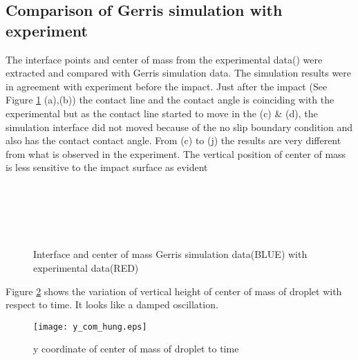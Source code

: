 \subsection{Comparison of Gerris simulation with experiment}
The interface points and center of mass from the experimental data(\cite{Hung2011}) were extracted and compared with Gerris simulation data. 
The simulation results were in agreement with experiment before the impact. Just after the impact (See Figure \ref{Fig:gs5} (a),(b)) the contact line and the contact angle is coinciding with 
the experimental but as the contact line started to move in the (c) \& (d), the simulation interface did not moved because of the no slip boundary condition and also has the contact 
contact angle. From (c) to (j) the results are very different from what is observed in the experiment. The vertical position of center of mass is less sensitive to the impact surface
as evident 

\begin{figure}
 \centering
   \\
       \\
       \\
       \\
 \caption{Interface and center of mass Gerris simulation data(BLUE) with \cite{Hung2011} experimental data(RED)}
 \label{Fig:gs5}
 \end{figure}
 
% 
Figure \ref{Fig:y_com} shows the variation of vertical height of center of mass of droplet with respect to time. It looks like a damped oscillation.  
\begin{figure}
 \texttt{[image: y\_com\_hung.eps]}
 \caption{y coordinate of center of mass of droplet to time}
 \label{Fig:y_com}
\end{figure}


